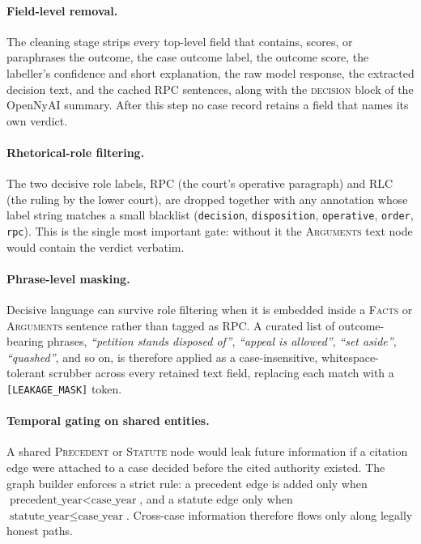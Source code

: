 \paragraph{Field-level removal.} The cleaning stage strips every
top-level field that contains, scores, or paraphrases the outcome,
the case outcome label, the outcome score, the labeller's confidence
and short explanation, the raw model response, the extracted decision
text, and the cached \textsc{RPC} sentences, along with the
\textsc{decision} block of the OpenNyAI summary. After this step no
case record retains a field that names its own verdict.

\paragraph{Rhetorical-role filtering.} The two decisive role labels,
\textsc{RPC} (the court's operative paragraph) and \textsc{RLC} (the
ruling by the lower court), are dropped together with any annotation
whose label string matches a small blacklist (\texttt{decision},
\texttt{disposition}, \texttt{operative}, \texttt{order},
\texttt{rpc}). This is the single most important gate: without it the
\textsc{Arguments} text node would contain the verdict verbatim.

\paragraph{Phrase-level masking.} Decisive language can survive role
filtering when it is embedded inside a \textsc{Facts} or
\textsc{Arguments} sentence rather than tagged as \textsc{RPC}. A
curated list of outcome-bearing phrases,
\emph{``petition stands disposed of''},
\emph{``appeal is allowed''},
\emph{``set aside''},
\emph{``quashed''}, and so on, is therefore applied as a
case-insensitive, whitespace-tolerant scrubber across every retained
text field, replacing each match with a \texttt{[LEAKAGE\_MASK]} token.

\paragraph{Temporal gating on shared entities.} A shared
\textsc{Precedent} or \textsc{Statute} node would leak future
information if a citation edge were attached to a case decided before
the cited authority existed. The graph builder enforces a strict rule:
a precedent edge is added only when
$\text{precedent\_year} < \text{case\_year}$, and a statute edge only
when $\text{statute\_year} \leq \text{case\_year}$. Cross-case
information therefore flows only along legally honest paths.

